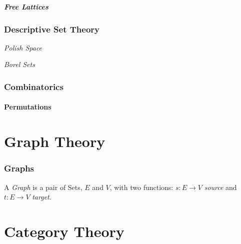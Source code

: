 \documentclass{article}
\begin{document}
\subsubsection{Free Lattices}

\section{Descriptive Set Theory}

\emph{Polish Space}

\emph{Borel Sets}

\section{Combinatorics}

\subsection{Permutations}\label{subsec:permutations}

\part{Graph Theory}

\section{Graphs} \label{sec:graphs}

A \emph{Graph} is a pair of Sets, $E$ and $V$, with two functions: $s:
E \rightarrow V$ \emph{source} and $t: E \rightarrow V$ \emph{target}.

\part{Category Theory}\label{sec:category_theory}\cite{awodey06}
\end{document}
